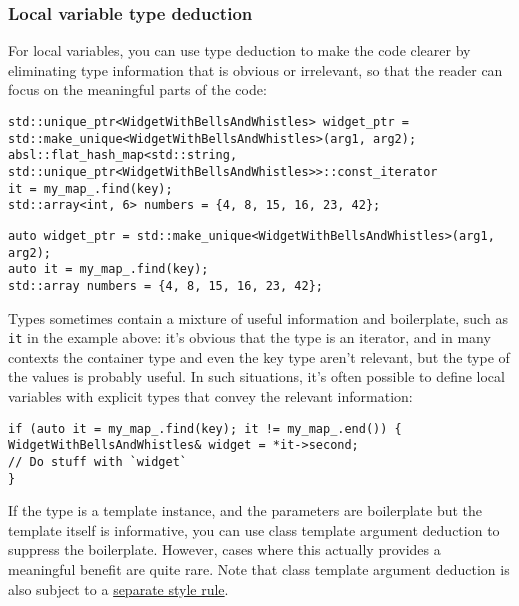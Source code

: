 \subsubsection{Local variable type deduction}
For local variables, you can use type deduction to make the code clearer by eliminating type information that is obvious or irrelevant, so that the reader can focus on the meaningful parts of the code:
\begin{verbatim}
std::unique_ptr<WidgetWithBellsAndWhistles> widget_ptr =
std::make_unique<WidgetWithBellsAndWhistles>(arg1, arg2);
absl::flat_hash_map<std::string,
std::unique_ptr<WidgetWithBellsAndWhistles>>::const_iterator
it = my_map_.find(key);
std::array<int, 6> numbers = {4, 8, 15, 16, 23, 42};
\end{verbatim}
\begin{verbatim}
auto widget_ptr = std::make_unique<WidgetWithBellsAndWhistles>(arg1, arg2);
auto it = my_map_.find(key);
std::array numbers = {4, 8, 15, 16, 23, 42};
\end{verbatim}
Types sometimes contain a mixture of useful information and boilerplate, such as \texttt{it} in the example above: it's obvious that the type is an iterator, and in many contexts the container type and even the key type aren't relevant, but the type of the values is probably useful. In such situations, it's often possible to define local variables with explicit types that convey the relevant information:
\begin{verbatim}
if (auto it = my_map_.find(key); it != my_map_.end()) {
WidgetWithBellsAndWhistles& widget = *it->second;
// Do stuff with `widget`
}
\end{verbatim}
If the type is a template instance, and the parameters are boilerplate but the template itself is informative, you can use class template argument deduction to suppress the boilerplate. However, cases where this actually provides a meaningful benefit are quite rare. Note that class template argument deduction is also subject to a \hyperref[sec:class-template-argument-deduction]{separate style rule}.

